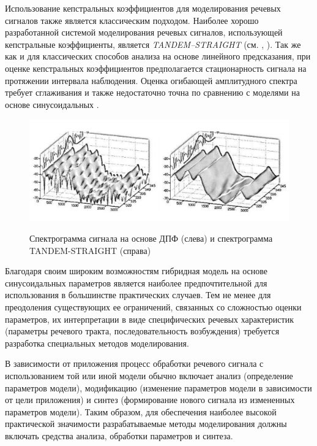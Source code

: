 Использование кепстральных коэффициентов для моделирования речевых сигналов также является классическим подходом. Наиболее хорошо разработанной системой моделирования речевых сигналов, использующей кепстральные коэффициенты, является \textit{TANDEM–STRAIGHT} (см. , ). Так же как и для классических способов анализа на основе линейного предсказания, при оценке кепстральных коэффициентов предполагается стационарность сигнала на протяжении интервала наблюдения. Оценка огибающей амплитудного спектра требует сглаживания и также недостаточно точна по сравнению с моделями на основе синусоидальных   \textit{}.

\begin{figure}[H]
    \caption{Спектрограмма сигнала на основе ДПФ (слева) и спектрограмма TANDEM-STRAIGHT (справа)}
    \includegraphics[scale=1.0, width=1.0\textwidth]{author/part4/figures/ch43_fig06_straight-spectrum.png}
    \label{fig:straight-spectrum}
\end{figure}


Благодаря своим широким возможностям гибридная модель на основе синусоидальных параметров является наиболее предпочтительной для использования в большинстве практических случаев. Тем не менее для преодоления существующих ее ограничений, связанных со сложностью оценки параметров, их интерпретации в виде специфических речевых характеристик (параметры речевого тракта, последовательность возбуждения) требуется разработка специальных методов моделирования. 

В зависимости от приложения процесс обработки речевого сигнала с использованием той или иной модели обычно включает анализ (определение параметров модели), модификацию (изменение параметров модели в зависимости от цели приложения) и синтез (формирование нового сигнала из измененных параметров модели). Таким образом, для обеспечения наиболее высокой практической значимости разрабатываемые методы моделирования должны включать средства анализа, обработки параметров и синтеза.

